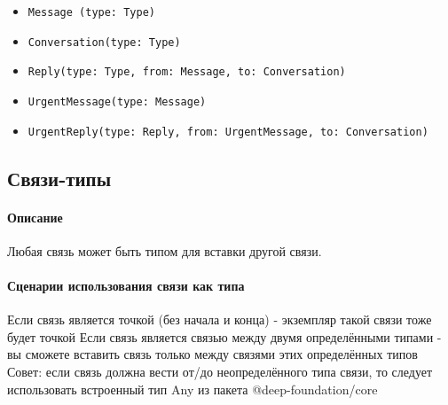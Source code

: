 \documentclass{article}
\begin{document}
\begin{itemize}
  \item \texttt{Message (type: Type)}
  \item \texttt{Conversation(type: Type)}
  \item \texttt{Reply(type: Type, from: Message, to: Conversation)}
  \item \texttt{UrgentMessage(type: Message)}
  \item \texttt{UrgentReply(type: Reply, from: UrgentMessage, to:
          Conversation)}
\end{itemize}

\subsection{Связи-типы}
\paragraph{Описание}
Любая связь может быть типом для вставки другой связи.
\paragraph{Сценарии использования связи как типа}
Если связь является точкой (без начала и конца) - экземпляр такой связи тоже
будет точкой
Если связь является связью между двумя определёнными типами - вы сможете
вставить связь только между связями этих определённых типов
Совет: если связь должна вести от/до неопределённого типа связи, то следует
использовать встроенный тип Any из пакета @deep-foundation/core
\end{document}
